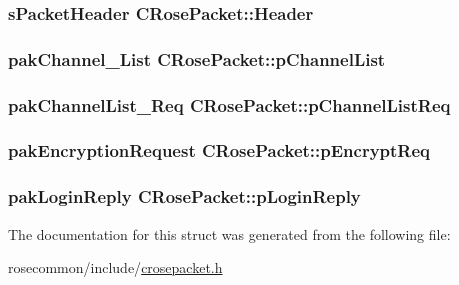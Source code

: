 \subsubsection[{\texorpdfstring{Header}{Header}}]{\setlength{\rightskip}{0pt plus 5cm}s\+Packet\+Header C\+Rose\+Packet\+::\+Header}\hypertarget{structCRosePacket_a5fd55d9dc0a08df2a51f06399938bf20}{}\label{structCRosePacket_a5fd55d9dc0a08df2a51f06399938bf20}
\subsubsection[{\texorpdfstring{p\+Channel\+List}{pChannelList}}]{\setlength{\rightskip}{0pt plus 5cm}pak\+Channel\+\_\+\+List C\+Rose\+Packet\+::p\+Channel\+List}\hypertarget{structCRosePacket_ab46e55f876dd5e2e70b30b1308062401}{}\label{structCRosePacket_ab46e55f876dd5e2e70b30b1308062401}
\subsubsection[{\texorpdfstring{p\+Channel\+List\+Req}{pChannelListReq}}]{\setlength{\rightskip}{0pt plus 5cm}pak\+Channel\+List\+\_\+\+Req C\+Rose\+Packet\+::p\+Channel\+List\+Req}\hypertarget{structCRosePacket_a1365464fce4f8eb2792c06a7ab76c607}{}\label{structCRosePacket_a1365464fce4f8eb2792c06a7ab76c607}
\subsubsection[{\texorpdfstring{p\+Encrypt\+Req}{pEncryptReq}}]{\setlength{\rightskip}{0pt plus 5cm}pak\+Encryption\+Request C\+Rose\+Packet\+::p\+Encrypt\+Req}\hypertarget{structCRosePacket_a962aba85cb1c1b25e892e5998d31e001}{}\label{structCRosePacket_a962aba85cb1c1b25e892e5998d31e001}
\subsubsection[{\texorpdfstring{p\+Login\+Reply}{pLoginReply}}]{\setlength{\rightskip}{0pt plus 5cm}pak\+Login\+Reply C\+Rose\+Packet\+::p\+Login\+Reply}\hypertarget{structCRosePacket_aa000a7926ffde2c71a415d2923f4f3b1}{}\label{structCRosePacket_aa000a7926ffde2c71a415d2923f4f3b1}


The documentation for this struct was generated from the following file\+:\begin{DoxyCompactItemize}
\item 
rosecommon/include/\hyperlink{crosepacket_8h}{crosepacket.\+h}\end{DoxyCompactItemize}
